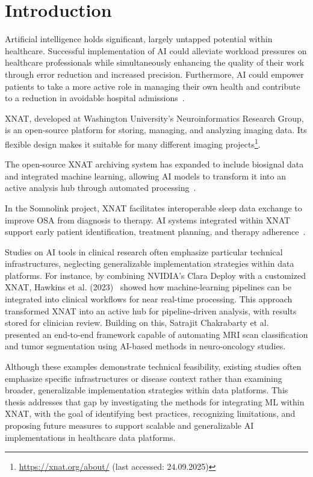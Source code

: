 

\chapter{Introduction}

Artificial intelligence holds significant, largely untapped potential within healthcare. Successful implementation of \ac{AI} could alleviate workload pressures on healthcare professionals while simultaneously enhancing the quality of their work through error reduction and increased precision. Furthermore, AI could empower patients to take a more active role in managing their own health and contribute to a reduction in avoidable hospital admissions~\cite{aung_promise_2021}.


XNAT, developed at Washington University’s Neuroinformatics Research Group, is an open-source platform for storing, managing, and analyzing imaging data. Its flexible design makes it suitable for many different imaging projects\footnote{\url{https://xnat.org/about/} (last accessed: 24.09.2025)}.


The open-source XNAT archiving system has expanded to include biosignal data and integrated machine learning, allowing AI models to transform it into an active analysis hub through automated processing~\cite{marcus_extensible_2007}.

In the Somnolink project, XNAT facilitates interoperable sleep data exchange to improve \ac{OSA} from diagnosis to therapy. AI systems integrated within XNAT support early patient identification, treatment planning, and therapy  adherence~\cite{internetredaktion_somnolink_nodate}.

Studies on AI tools in clinical research often emphasize particular technical infrastructures, neglecting generalizable implementation strategies within data platforms. For instance, by combining NVIDIA’s Clara Deploy with a customized XNAT, Hawkins et al. (2023)~\cite{hawkins_implementation_2023} showed how machine-learning pipelines can be integrated into clinical workflows for near real-time processing. This approach transformed XNAT into an active hub for pipeline-driven analysis, with results stored for clinician review. Building on this, Satrajit Chakrabarty et al. ~\cite{chakrabarty_deep_2023} presented an end-to-end framework capable of automating \ac{MRI} scan classification and tumor segmentation using AI-based methods in neuro-oncology studies.

Although these examples demonstrate technical feasibility, existing studies often emphasize specific infrastructures or disease context rather than examining broader, generalizable implementation strategies within data platforms. This thesis addresses that gap by investigating the methods for integrating \ac{ML} within XNAT, with the goal of identifying best practices, recognizing limitations, and proposing future measures to support scalable and generalizable AI implementations in healthcare data platforms.

